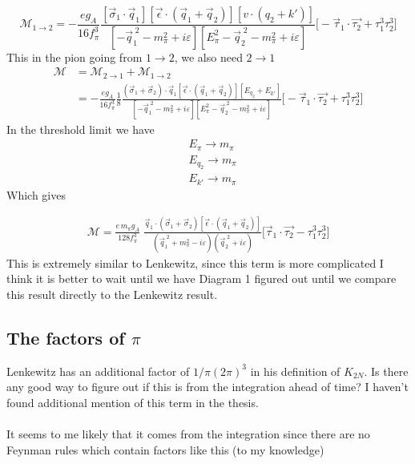 \documentclass[11pt]{article}
\newcommand{\eps}{\epsilon}
\newcommand\ddfrac[2]{\frac{\displaystyle #1}{\displaystyle #2}}
\begin{document}
\begin{equation}
    \mathcal{M}_{1\to2}= -\frac{e g_A} {16 f_\pi^3}
                \ddfrac{
                    \left[\vec{\sigma}_1 \cdot \vec{q}_1\right]
                    \left[\vec{\eps} \cdot (\vec{q}_1 + \vec{q}_2)\right]
                    \left[ v \cdot \left(q_2 + k'\right) \right]
                }{
                    \left[ -\vec{q}_1^{\;2} - m_\pi^2 + i \varepsilon  \right]
                    \left[E_\pi^2 - \vec{q}_2^{\;2} - m_\pi^2 + i \varepsilon\right]
                } \Big[ -\vec{\tau}_1 \cdot \vec{\tau_2} + \tau_1^3 \tau_2^3 \Big]
\end{equation}
This in the pion going from $1\to 2$, we also need $2 \to 1$
\begin{align}
    \mathcal{M}&=\mathcal{M}_{2\to1}+\mathcal{M}_{1\to2}\\
               &= -\frac{e g_A} {16 f_\pi^3} \frac{1}{8} 
                \ddfrac{
                (\vec{\sigma}_1+\vec{\sigma}_2) \cdot \vec{q}_1
                    \left[\vec{\eps} \cdot (\vec{q}_1 + \vec{q}_2)\right]
                    \left[ E_{q_2} + E_{k'} \right]
                }{
                    \left[ -\vec{q}_1^{\;2} - m_\pi^2 + i \varepsilon  \right]
                    \left[E_\pi^2 - \vec{q}_2^{\;2} - m_\pi^2 + i \varepsilon\right]
                } \Big[ -\vec{\tau}_1 \cdot \vec{\tau_2} + \tau_1^3 \tau_2^3 \Big]
\end{align}
In the threshold limit we have
\begin{align}
    &E_\pi \to m_\pi\\
    &E_{q_2}\to m_\pi\\
    & E_{k'} \to m_\pi
\end{align}
Which gives

\begin{align}
    \mathcal{M} =\frac{e\, m_\pi g_A} {128 f_\pi^3}\;
                \ddfrac{
                    \vec{q}_1 \cdot(\vec{\sigma}_1+\vec{\sigma}_2)
                    \left[\vec{\eps} \cdot (\vec{q}_1 + \vec{q}_2)\right]
                }{
                    \left( \vec{q}_1^{\;2} +m_\pi^2 - i \varepsilon  \right)
                    \left(\vec{q}_2^{\;2}+ i \varepsilon\right)
                } \Big[ \vec{\tau}_1 \cdot \vec{\tau_2} - \tau_1^3 \tau_2^3 \Big]
\end{align}
This is extremely similar to Lenkewitz, since this term is more complicated I think it is better to wait until we have Diagram 1 figured out until we compare this result directly to the Lenkewitz result.
\subsection{The factors of $\pi$}
Lenkewitz has an additional factor of $1/\pi(2\pi)^3$ in his definition of $K_{2N}$. Is there any good way to figure out if this is from the integration ahead of time? I haven't found additional mention of this term in the thesis.\\~\\
It seems to me likely that it comes from the integration since there are no Feynman rules which contain factors like this (to my knowledge)
\end{document}
